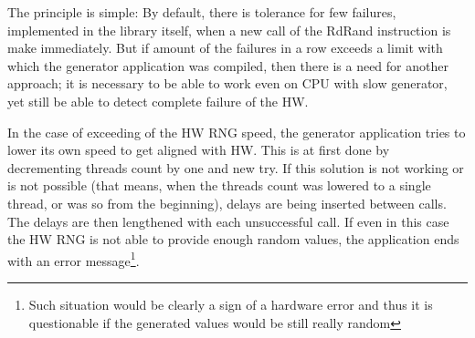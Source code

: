 The principle is simple: By default, there is tolerance for few failures, implemented in the library itself, when a new call of the RdRand instruction is make immediately. But if amount of the failures in a row exceeds a limit with which the generator application was compiled, then there is a need for another approach; it is necessary to be able to work even on CPU with slow generator, yet still be able to detect complete failure of the HW.

In the case of exceeding of the HW RNG speed, the generator application tries to lower its own speed to get aligned with HW. This is at first done by decrementing threads count by one and new try. If this solution is not working or is not possible (that means, when the threads count was lowered to a single thread, or was so from the beginning), delays are being inserted between calls. The delays are then lengthened with each unsuccessful call. If even in this case the HW RNG is not able to provide enough random values, the application ends with an error message\footnote{Such situation would be clearly a sign of a hardware error and thus it is questionable if the generated values would be still really random}.

